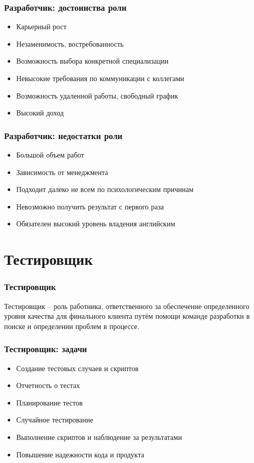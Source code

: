 \documentclass{../industrial-development}
\begin{document}
	\begin{frame} \frametitle{Разработчик: достоинства роли}
		\begin{itemize}
			\item Карьерный рост
			\item Незаменимость, востребованность 
			\item Возможность выбора конкретной специализации
			\item Невысокие требования по коммуникации с коллегами
			\item Возможность удаленной работы, свободный график
			\item Высокий доход
		\end{itemize}
	\end{frame}
	
	\begin{frame} \frametitle{Разработчик: недостатки роли}
		\begin{itemize}
			\item Большой объем работ
			\item Зависимость от менеджмента
			\item Подходит далеко не всем по психологическим причинам
			\item Невозможно получить результат с первого раза
			\item Обязателен высокий уровень владения английским
		\end{itemize}
	\end{frame}
	
	\section{Тестировщик }
	
	\begin{frame} \frametitle{Тестировщик}
		\begin{block}{}
			\alert {Тестировщик} – роль работника, ответственного за обеспечение определенного уровня качества для финального клиента путём помощи команде разработки в поиске и определении проблем в процессе.
		\end{block}
		
	\end{frame}
	
	\begin{frame} \frametitle{Тестировщик: задачи}
		\begin{itemize}
			\item Создание тестовых случаев и скриптов
			\item Отчетность о тестах
			\item Планирование тестов
			\item Случайное тестирование
			\item Выполнение скриптов и наблюдение за результатами 
			\item Повышение надежности кода и продукта
		\end{itemize}
	\end{frame}
	
\end{document}
